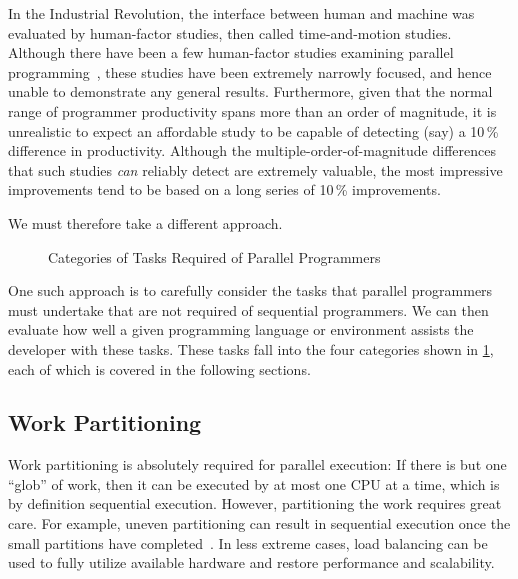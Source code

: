 In the Industrial Revolution, the interface between human and machine
was evaluated by human-factor studies, then called time-and-motion
studies.
Although there have been a few human-factor studies examining parallel
programming~\cite{RyanEccles2005HPCSNovice,RyanEccles2006HPCSNoviceNeeds,
LorinHochstein2005SC,DuaneSzafron1994PEMPDS}, these studies have
been extremely narrowly focused, and hence unable to demonstrate any
general results.
Furthermore, given that the normal range of programmer productivity
spans more than an order of magnitude, it is unrealistic to expect
an affordable study to be capable of detecting (say) a 10\,\% difference
in productivity.
Although the multiple-order-of-magnitude differences that such studies
\emph{can} reliably detect are extremely valuable, the most impressive
improvements tend to be based on a long series of 10\,\% improvements.

We must therefore take a different approach.

\begin{figure}
\centering
{}
\caption{Categories of Tasks Required of Parallel Programmers}
\label{fig:intro:Categories of Tasks Required of Parallel Programmers}
\end{figure}

One such approach is to carefully consider the tasks that parallel
programmers must undertake that are not required of sequential programmers.
We can then evaluate how well a given programming language or environment
assists the developer with these tasks.
These tasks fall into the four categories shown in
\cref{fig:intro:Categories of Tasks Required of Parallel Programmers},
each of which is covered in the following sections.

\subsection{Work Partitioning}
\label{sec:intro:Work Partitioning}

Work partitioning is absolutely required for parallel execution:
If there is but one ``glob'' of work, then it can be executed by at
most one CPU at a time, which is by definition sequential execution.
However, partitioning the work requires great care.
For example, uneven partitioning can result in sequential execution
once the small partitions have completed~\cite{GeneAmdahl1967AmdahlsLaw}.
In less extreme cases, load balancing can be used to fully utilize
available hardware and restore performance and scalability.

